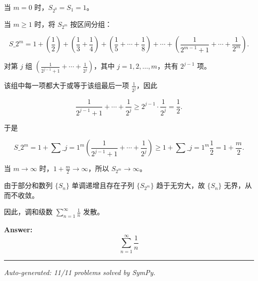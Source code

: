 \documentclass[12pt, a4paper]{article}
\begin{document}
当 $m=0$ 时，$S_{2^0}=S_1=1$。

当 $m\ge 1$ 时，将 $S_{2^m}$ 按区间分组：

\[

S\_{2^m}=1+\left(\frac12\right)+\left(\frac13+\frac14\right)+\left(\frac15+\cdots+\frac18\right)+\cdots+\left(\frac{1}{2^{m-1}+1}+\cdots+\frac{1}{2^m}\right).

\]

对第 $j$ 组 $\left(\frac{1}{2^{j-1}+1}+\cdots+\frac{1}{2^j}\right)$，其中 $j=1,2,\dots,m$，共有 $2^{j-1}$ 项。

该组中每一项都大于或等于该组最后一项 $\frac{1}{2^j}$，因此

\[

\frac{1}{2^{j-1}+1}+\cdots+\frac{1}{2^j}

\ge 2^{j-1}\cdot \frac{1}{2^j}

=\frac12.

\]

于是

\[

S\_{2^m}

=1+\sum\_{j=1}^{m}\left(\frac{1}{2^{j-1}+1}+\cdots+\frac{1}{2^j}\right)

\ge 1+\sum\_{j=1}^{m}\frac12

=1+\frac{m}{2}.

\]

当 $m\to\infty$ 时，$1+\frac{m}{2}\to\infty$，所以 $S_{2^m}\to\infty$。

由于部分和数列 $\{S_n\}$ 单调递增且存在子列 $\{S_{2^m}\}$ 趋于无穷大，故 $\{S_n\}$ 无界，从而不收敛。

因此，调和级数 $\sum_{n=1}^{\infty}\frac{1}{n}$ 发散。

\textbf{Answer:}
\[\boxed{\sum_{n=1}^{\infty}\frac{1}{n}}\]

\vspace{1em}
\hrule
\vspace{1em}


\vspace{2em}
\noindent\textit{Auto-generated: 11/11 problems solved by SymPy.}
\end{document}

